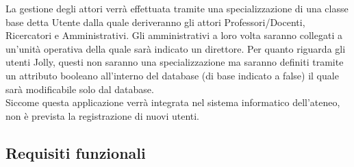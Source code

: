 \documentclass{article}
\begin{document}
La gestione degli attori verrà effettuata tramite una specializzazione di una classe base detta Utente dalla quale deriveranno gli attori Professori/Docenti, Ricercatori e Amministrativi. Gli amministrativi a loro volta saranno collegati a un’unità operativa della quale sarà indicato un direttore. Per quanto riguarda gli utenti Jolly, questi non saranno una specializzazione ma saranno definiti tramite un attributo booleano all’interno del database (di base indicato a false) il quale sarà modificabile solo dal database.\\
Siccome questa applicazione verrà integrata nel sistema informatico dell'ateneo, non è prevista la registrazione di nuovi utenti.

\subsection{Requisiti funzionali}
\end{document}
